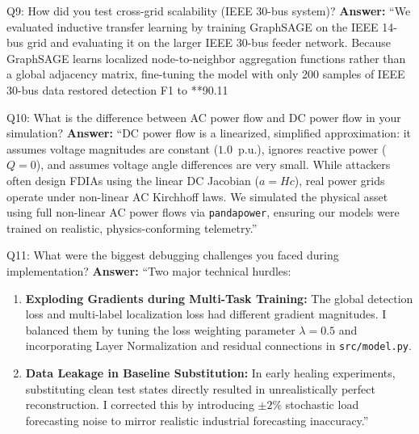 \documentclass[10pt,a4paper]{article}
\begin{document}
\begin{qabox}{Q9: How did you test cross-grid scalability (IEEE 30-bus system)?}
\textbf{Answer:}
``We evaluated inductive transfer learning by training GraphSAGE on the IEEE 14-bus grid and evaluating it on the larger IEEE 30-bus feeder network. Because GraphSAGE learns localized node-to-neighbor aggregation functions rather than a global adjacency matrix, fine-tuning the model with only 200 samples of IEEE 30-bus data restored detection F1 to **90.11%
\end{qabox}

\begin{qabox}{Q10: What is the difference between AC power flow and DC power flow in your simulation?}
\textbf{Answer:}
``DC power flow is a linearized, simplified approximation: it assumes voltage magnitudes are constant ($1.0$~p.u.), ignores reactive power ($Q = 0$), and assumes voltage angle differences are very small. While attackers often design FDIAs using the linear DC Jacobian ($a = Hc$), real power grids operate under non-linear AC Kirchhoff laws. We simulated the physical asset using full non-linear AC power flows via \texttt{pandapower}, ensuring our models were trained on realistic, physics-conforming telemetry.''
\end{qabox}

\begin{qabox}{Q11: What were the biggest debugging challenges you faced during implementation?}
\textbf{Answer:}
``Two major technical hurdles:
\begin{enumerate}[noitemsep]
    \item \textbf{Exploding Gradients during Multi-Task Training:} The global detection loss and multi-label localization loss had different gradient magnitudes. I balanced them by tuning the loss weighting parameter $\lambda = 0.5$ and incorporating Layer Normalization and residual connections in \texttt{src/model.py}.
    \item \textbf{Data Leakage in Baseline Substitution:} In early healing experiments, substituting clean test states directly resulted in unrealistically perfect reconstruction. I corrected this by introducing $\pm 2\%$ stochastic load forecasting noise to mirror realistic industrial forecasting inaccuracy.''
\end{enumerate}
\end{qabox}
\end{document}
